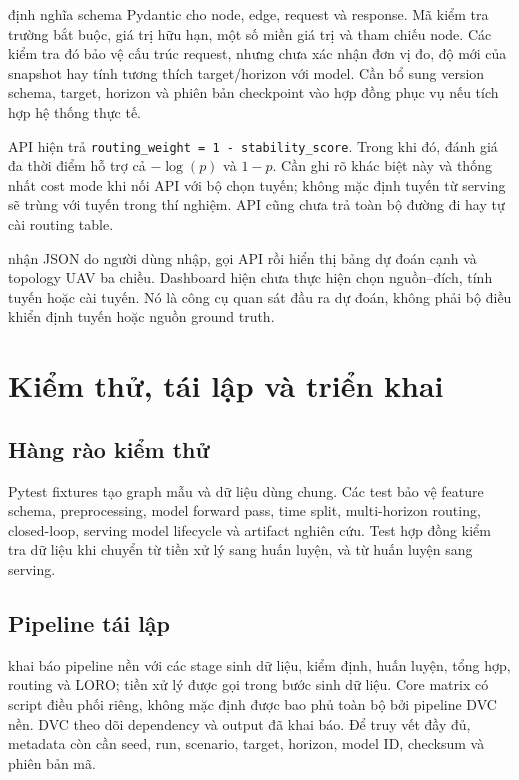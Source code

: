 \documentclass[12pt,a4paper]{article}
\newcommand{\code}[1]{{\small\texttt{#1}}}
\begin{document}
 định nghĩa schema Pydantic cho node, edge, request và response. Mã kiểm tra trường bắt buộc, giá trị hữu hạn, một số miền giá trị và tham chiếu node. Các kiểm tra đó bảo vệ cấu trúc request, nhưng chưa xác nhận đơn vị đo, độ mới của snapshot hay tính tương thích target/horizon với model. Cần bổ sung version schema, target, horizon và phiên bản checkpoint vào hợp đồng phục vụ nếu tích hợp hệ thống thực tế.

API hiện trả \code{routing\_weight = 1 - stability\_score}. Trong khi đó, đánh giá đa thời điểm hỗ trợ cả \(-\log(p)\) và \(1-p\). Cần ghi rõ khác biệt này và thống nhất cost mode khi nối API với bộ chọn tuyến; không mặc định tuyến từ serving sẽ trùng với tuyến trong thí nghiệm. API cũng chưa trả toàn bộ đường đi hay tự cài routing table.

 nhận JSON do người dùng nhập, gọi API rồi hiển thị bảng dự đoán cạnh và topology UAV ba chiều. Dashboard hiện chưa thực hiện chọn nguồn--đích, tính tuyến hoặc cài tuyến. Nó là công cụ quan sát đầu ra dự đoán, không phải bộ điều khiển định tuyến hoặc nguồn ground truth.

\section{Kiểm thử, tái lập và triển khai}
\label{sec:operations}

\subsection{Hàng rào kiểm thử}

Pytest fixtures tạo graph mẫu và dữ liệu dùng chung. Các test bảo vệ feature schema, preprocessing, model forward pass, time split, multi-horizon routing, closed-loop, serving model lifecycle và artifact nghiên cứu. Test hợp đồng kiểm tra dữ liệu khi chuyển từ tiền xử lý sang huấn luyện, và từ huấn luyện sang serving.

\subsection{Pipeline tái lập}

 khai báo pipeline nền với các stage sinh dữ liệu, kiểm định, huấn luyện, tổng hợp, routing và LORO; tiền xử lý được gọi trong bước sinh dữ liệu. Core matrix có script điều phối riêng, không mặc định được bao phủ toàn bộ bởi pipeline DVC nền. DVC theo dõi dependency và output đã khai báo. Để truy vết đầy đủ, metadata còn cần seed, run, scenario, target, horizon, model ID, checksum và phiên bản mã.
\end{document}
